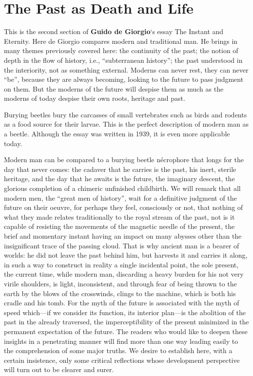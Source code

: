 \section{The Past as Death and Life}

\begin{quotationx}
This is the second section of \textbf{Guido de Giorgio}`s essay The Instant and Eternity. Here de Giorgio compares modern and traditional man. He brings in many themes previously covered here: the continuity of the past; the notion of depth in the flow of history, i.e., ``subterranean history''; the past understood in the interiority, not as something external. Moderns can never rest, they can never ``be'', because they are always becoming, looking to the future to pass judgment on them. But the moderns of the future will despise them as much as the moderns of today despise their own roots, heritage and past.

Burying beetles bury the carcasses of small vertebrates such as birds and rodents as a food source for their larvae. This is the perfect description of modern man as a beetle. Although the essay was written in 1939, it is even more applicable today.
\end{quotationx}


Modern man can be compared to a burying beetle nécrophore that longs for the day that never comes: the cadaver that he carries is the past, his inert, sterile heritage, and the day that he awaits is the future, the imaginary descent, the glorious completion of a chimeric unfinished childbirth. We will remark that all modern men, the ``great men of history'', wait for a definitive judgment of the future on their oeuvre, for perhaps they feel, consciously or not, that nothing of what they made relates traditionally to the royal stream of the past, not is it capable of resisting the movements of the magnetic needle of the present, the brief and momentary instant having an impact on many abysses other than the insignificant trace of the passing cloud. That is why ancient man is a bearer of worlds: he did not leave the past behind him, but harvests it and carries it along, in such a way to construct in reality a single incidental point, the sole present, the current time, while modern man, discarding a heavy burden for his not very virile shoulders, is light, inconsistent, and through fear of being thrown to the earth by the blows of the crosswinds, clings to the machine, which is both his cradle and his tomb. For the myth of the future is associated with the myth of speed which---if we consider its function, its interior plan---is the abolition of the past in the already traversed, the imperceptibility of the present minimized in the permanent expectation of the future. The readers who would like to deepen these insights in a penetrating manner will find more than one way leading easily to the comprehension of some major truths. We desire to establish here, with a certain insistence, only some critical reflections whose development perspective will turn out to be clearer and surer.

